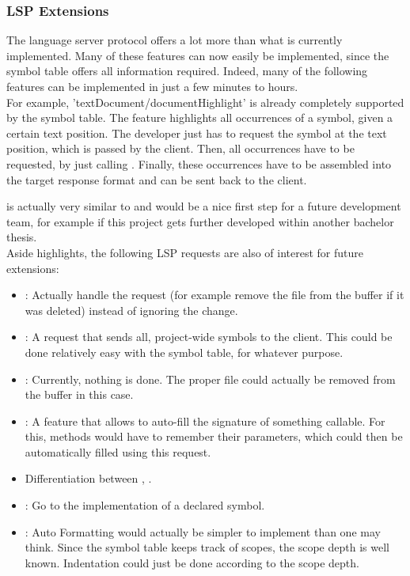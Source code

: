 \subsubsection{LSP Extensions}
The language server protocol \cite{lspspec} offers a lot more than what is currently implemented.
Many of these features can now easily be implemented, since the symbol table offers all information required.
Indeed, many of the following features can be implemented in just a few minutes to hours.\\

For example, 'textDocument/documentHighlight' \cite{lspspec} is already completely supported by the symbol table.
The feature highlights all occurrences of a symbol, given a certain text position.
The developer just has to request the symbol at the text position, which is passed by the client.
Then, all occurrences have to be requested, by just calling .
Finally, these occurrences have to be assembled into the target response format  and can be sent back to the client.

 is actually very similar to  and would be a nice first step for a future development team,
for example if this project gets further developed within another bachelor thesis.\\

Aside highlights, the following LSP requests are also of interest for future extensions:
\begin{itemize}
    \item {}: Actually handle the request (for example remove the file from the buffer if it was deleted) instead of ignoring the change.
    \item {}: A request that sends all, project-wide symbols to the client. This could be done relatively easy with the symbol table, for whatever purpose.
    \item {}: Currently, nothing is done. The proper file could actually be removed from the buffer in this case.
    \item {}: A feature that allows to auto-fill the signature of something callable. For this, methods would have to remember their parameters, which could then be automatically filled using this request.
    \item Differentiation between , .
    \item {}: Go to the implementation of a declared symbol.
    \item {}: Auto Formatting would actually be simpler to implement than one may think. Since the symbol table keeps track of scopes, the scope depth is well known. Indentation could just be done according to the scope depth.
\end{itemize}

